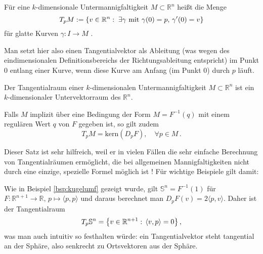\documentclass[../H_Analysis_main.tex]{subfiles}
\begin{document}
\begin{defi}[Tangentialraum]
Für eine $k$-dimensionale Untermannigfaltigkeit $M \subset \mathbb{R}^n$ heißt die Menge
\begin{equation}
T_p M := \qty{v \in \mathbb{R}^n: \; \exists \gamma \text{ mit } \gamma(0) = p, \, \gamma'(0) = v}
\end{equation}
für glatte Kurven $\gamma: I \rightarrow M$ .
\end{defi}
Man setzt hier also einen Tangentialvektor als Ableitung (was wegen des eindimensionalen Definitionsbereichs der Richtungsableitung entspricht) im Punkt 0 entlang einer Kurve, wenn diese Kurve am Anfang (im Punkt 0) durch $p$ läuft.

\begin{satz}
Der Tangentialraum einer $k$-dimensionalen Untermannigfaltigkeit $M \subset \mathbb{R}^n$ ist ein $k$-dimensionaler Untervektorraum des $\mathbb{R}^n$.

Falls $M$ implizit über eine Bedingung der Form $M = F^{-1}(q)$ mit einem regulären Wert $q$ von $F$ gegeben ist, so gilt zudem
\begin{equation}
T_p M = \text{kern}(D_p F), \quad \forall p \in M \, .
\end{equation}
\end{satz}

Dieser Satz ist sehr hilfreich, weil er in vielen Fällen die sehr einfache Berechnung von Tangentialräumen ermöglicht, die bei allgemeinen Mannigfaltigkeiten nicht durch eine einzige, spezielle Formel möglich ist ! Für wichtige Beispiele gilt damit:
\begin{bsp}
Wie in Beispiel \ref{bsp:kugelumf} gezeigt wurde, gilt $\mathbb{S}^n = F^{-1}(1)$ für $F: \mathbb{R}^{n+1} \rightarrow \mathbb{R}, \, p \mapsto \langle p, p \rangle$ und daraus berechnet man $D_p F(v) = 2 \langle p, v \rangle$. Daher ist der Tangentialraum
\begin{equation}
T_p \mathbb{S}^n = \qty{v \in \mathbb{R}^{n+1}: \, \langle v, p\rangle = 0} \, ,
\end{equation}
was man auch intuitiv so festhalten würde: ein Tangentialvektor steht tangential an der Sphäre, also senkrecht zu Ortsvektoren aus der Sphäre.
\end{bsp}
\end{document}

